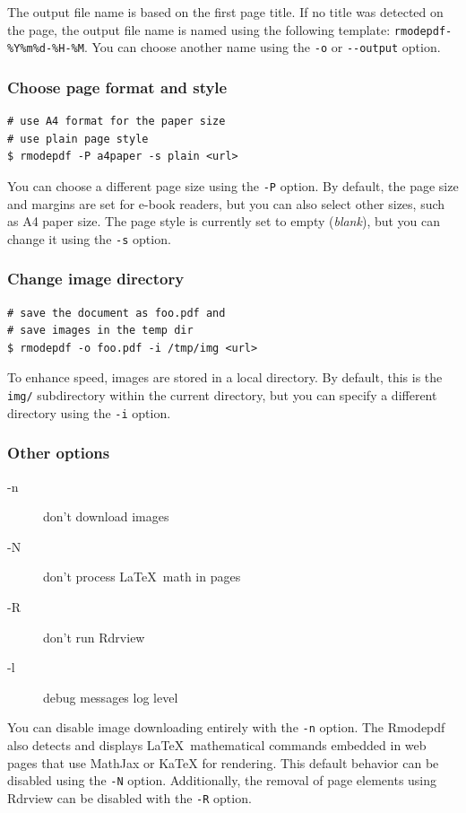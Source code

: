 The output file name is based on the first page title. If no title was detected on the page, the output file name 
is named using the following template: \verb|rmodepdf-%Y%m%d-%H-%M|. You can choose another name using 
the \verb|-o| or \verb|--output| option.

\begin{frame}[fragile]
  \frametitle{Choose page format and style}
\begin{verbatim}
# use A4 format for the paper size 
# use plain page style
$ rmodepdf -P a4paper -s plain <url>
\end{verbatim}
\end{frame}


You can choose a different page size using the \texttt{-P} option. By default,
the page size and margins are set for e-book readers, but you can also select
other sizes, such as A4 paper size. The page style is currently set to empty
(\textit{blank}), but you can change it using the \texttt{-s} option.

\begin{frame}[fragile]
  \frametitle{Change image directory}
\begin{verbatim}
# save the document as foo.pdf and 
# save images in the temp dir
$ rmodepdf -o foo.pdf -i /tmp/img <url>
\end{verbatim}

\end{frame}


To enhance speed, images are stored in a local directory. By default, this is
the \texttt{img/} subdirectory within the current directory, but you can
specify a different directory using the \texttt{-i} option. 

\begin{frame}[fragile]
  \frametitle{Other options}
  \begin{description}
    \item[-n] don't download images
    \item[-N] don't process \LaTeX\ math in pages
    \item[-R] don't run Rdrview
    \item[-l] debug messages log level
  \end{description}
\end{frame}


You can disable image downloading entirely with the \texttt{-n} option. 
The Rmodepdf also detects and displays \LaTeX\ mathematical commands
embedded in web pages that use MathJax or KaTeX for
rendering. This default behavior can be disabled using the \texttt{-N} option.
Additionally, the removal of page elements using Rdrview can be
disabled with the \texttt{-R} option.


